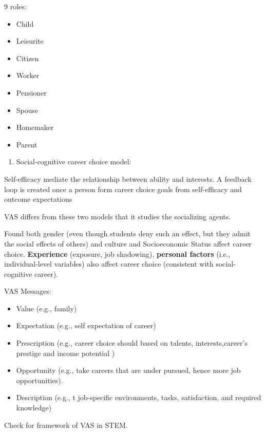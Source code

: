 \documentclass[
]{book}
\providecommand{\tightlist}{%
  \setlength{\itemsep}{0pt}\setlength{\parskip}{0pt}}
\begin{document}
9 roles:

\begin{itemize}
\tightlist
\item
  Child
\item
  Leisurite
\item
  Citizen
\item
  Worker
\item
  Pensioner
\item
  Spouse
\item
  Homemaker
\item
  Parent
\end{itemize}

\begin{enumerate}
\def\labelenumi{\arabic{enumi}.}
\setcounter{enumi}{1}
\tightlist
\item
  Social-cognitive career choice model: \citep{Lent_1994}
\end{enumerate}

Self-efficacy mediate the relationship between ability and interests. A feedback loop is created once a person form
career choice goals from self-efficacy and outcome expectations

VAS differs from these two models that it studies the socializing agents.

Found both gender (even though students deny such an effect, but they admit the social effects of others) and culture
and Socioeconomic Status affect career choice. \textbf{Experience} (exposure, job shadowing), \textbf{personal factors} (i.e.,
individual-level variables) also affect career choice (consistent with social-cognitive career).

VAS Messages:

\begin{itemize}
\tightlist
\item
  Value (e.g., family)
\item
  Expectation (e.g., self expectation of career)
\item
  Prescription (e.g., career choice should based on talents, interests,career's prestige and income potential )
\item
  Opportunity (e.g., take careers that are under pursued, hence more job opportunities).
\item
  Description (e.g., t job-specific environments, tasks, satisfaction, and required knowledge)
\end{itemize}

Check \citep[pp.107]{Myers_2010} for framework of VAS in STEM.
\end{document}
